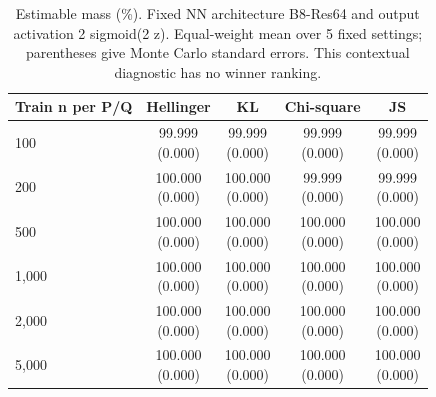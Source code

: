\begin{table}[t]
\centering
\small
\setlength{\tabcolsep}{4pt}
\caption{Estimable mass (\%). Fixed NN architecture B8-Res64 and output activation 2 sigmoid(2 z). Equal-weight mean over 5 fixed settings; parentheses give Monte Carlo standard errors. This contextual diagnostic has no winner ranking.}
\label{tab:sim-estimable-mass}
\begin{tabular}{lcccc}
\toprule
Train n per P/Q & Hellinger & KL & Chi-square & JS \\
\midrule
100 & \shortstack{99.999\\(0.000)} & \shortstack{99.999\\(0.000)} & \shortstack{99.999\\(0.000)} & \shortstack{99.999\\(0.000)} \\
200 & \shortstack{100.000\\(0.000)} & \shortstack{100.000\\(0.000)} & \shortstack{99.999\\(0.000)} & \shortstack{99.999\\(0.000)} \\
500 & \shortstack{100.000\\(0.000)} & \shortstack{100.000\\(0.000)} & \shortstack{100.000\\(0.000)} & \shortstack{100.000\\(0.000)} \\
1,000 & \shortstack{100.000\\(0.000)} & \shortstack{100.000\\(0.000)} & \shortstack{100.000\\(0.000)} & \shortstack{100.000\\(0.000)} \\
2,000 & \shortstack{100.000\\(0.000)} & \shortstack{100.000\\(0.000)} & \shortstack{100.000\\(0.000)} & \shortstack{100.000\\(0.000)} \\
5,000 & \shortstack{100.000\\(0.000)} & \shortstack{100.000\\(0.000)} & \shortstack{100.000\\(0.000)} & \shortstack{100.000\\(0.000)} \\
\bottomrule
\end{tabular}
\end{table}

